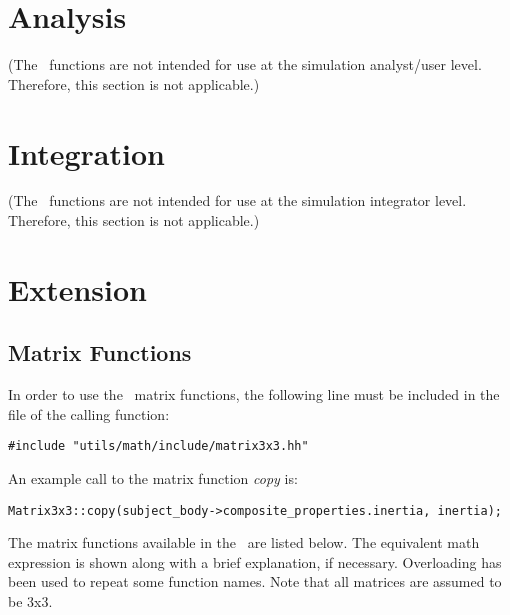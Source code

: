\section{Analysis}
(The \mathDesc\ functions are not intended for use at the simulation analyst/user level.
Therefore, this section is not applicable.)

\section{Integration}
(The \mathDesc\ functions are not intended for use at the simulation integrator level.
Therefore, this section is not applicable.)

\section{Extension}

\subsection{Matrix Functions}
In order to use the \mathDesc\ matrix functions, the following line must be included in the
file of the calling function:
\begin{verbatim}
#include "utils/math/include/matrix3x3.hh"
\end{verbatim}

An example call to the matrix function {\it copy} is:
\begin{verbatim}
Matrix3x3::copy(subject_body->composite_properties.inertia, inertia);
\end{verbatim}

The matrix functions available in the \mathDesc\ are listed below.  The equivalent math
expression is shown along with a brief explanation, if necessary. Overloading has been used
to repeat some function names. Note that all matrices are assumed to be 3x3. \newline\newline



